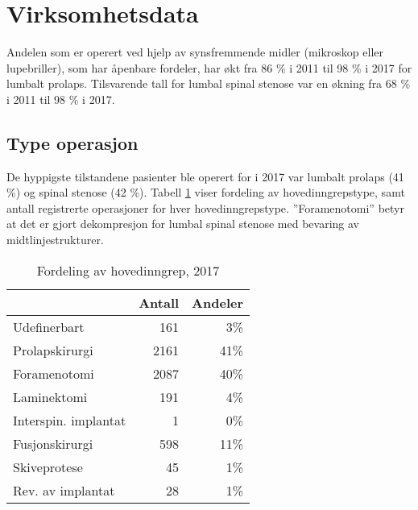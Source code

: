 \documentclass [norsk,a4paper,twoside]{article}\usepackage[]{graphicx}\usepackage[]{color}
\begin{document}
\section{Virksomhetsdata}

Andelen som er operert ved hjelp av synsfremmende midler (mikroskop eller
lupebriller), som har åpenbare fordeler, har økt fra 86 \% i 2011 til 
98 \% i 2017 for lumbalt prolaps. 
Tilsvarende tall for lumbal spinal stenose var en økning fra 68 \% i 2011 til 
98 \% i 2017.



\subsection{Type operasjon}



De hyppigste tilstandene pasienter ble operert for i 2017 var lumbalt prolaps (41 \%) og spinal stenose (42 \%). Tabell \ref{tab:AntHovedInngrep} viser fordeling av hovedinngrepstype, samt antall registrerte operasjoner for hver hovedinngrepstype.
''Foramenotomi'' betyr at det er gjort dekompresjon for lumbal spinal stenose med bevaring av midtlinjestrukturer. 

\begin{table}[ht]
\centering
\begin{tabular}{lrr}
  \hline
 & Antall & Andeler \\ 
  \hline
Udefinerbart & 161 & 3\% \\ 
  Prolapskirurgi & 2161 & 41\% \\ 
  Foramenotomi & 2087 & 40\% \\ 
  Laminektomi & 191 & 4\% \\ 
  Interspin. implantat & 1 & 0\% \\ 
  Fusjonskirurgi & 598 & 11\% \\ 
  Skiveprotese & 45 & 1\% \\ 
  Rev. av implantat & 28 & 1\% \\ 
   \hline
\end{tabular}
\caption{Fordeling av hovedinngrep, 2017} 
\label{tab:AntHovedInngrep}
\end{table}



\end{document}
